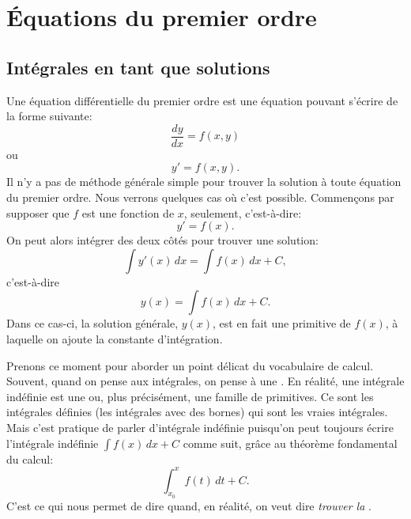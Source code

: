 \chapter{Équations du premier ordre} \label{fo:chapter}


\section{Intégrales en tant que solutions}
\label{integralsols:section}


Une équation différentielle du premier ordre est une équation pouvant s'écrire de la forme suivante:
\begin{equation*}
	\frac{dy}{dx} = f(x,y)
\end{equation*}
ou
\begin{equation*}
	y' = f(x,y) .
\end{equation*}
Il n'y a pas de méthode générale simple pour trouver la solution  à toute équation du premier ordre.
Nous verrons quelques cas où c'est possible.
Commençons par supposer que $f$ est une fonction de $x$, seulement, c'est-à-dire:
\begin{equation} \label{ias:inteq}
	y' = f(x) .
\end{equation}
On peut alors intégrer des deux côtés pour trouver une solution:
\begin{equation*}
	\int y'(x) \,dx = \int f(x) \,dx + C ,
\end{equation*}
c'est-à-dire
\begin{equation*}
	y(x) = \int f(x) \,dx + C .
\end{equation*}
Dans ce cas-ci, la solution générale, $y(x)$, est en fait une primitive de $f(x)$,
à laquelle on ajoute la constante d'intégration.

\medskip

Prenons ce moment pour aborder un point délicat du vocabulaire de calcul.
Souvent, quand on pense aux intégrales, on pense à une .
En réalité, une intégrale indéfinie est une \emph{} ou, plus précisément, une famille de primitives.
Ce sont les intégrales définies (les intégrales avec des bornes) qui sont les vraies intégrales.
Mais c'est pratique de parler d'intégrale \og{}indéfinie\fg{} puisqu'on peut toujours écrire l'intégrale indéfinie
$\int f(x) \,dx + C$ comme suit, grâce au théorème fondamental du calcul:
\begin{equation*}
	\int_{x_0}^x f(t) \,dt + C .
\end{equation*}
C'est ce qui nous permet de dire  \emph{ } quand, en réalité,
on veut dire  \emph{trouver la }.

